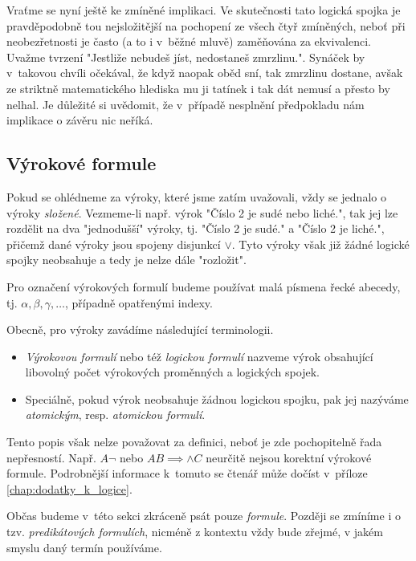 Vraťme se nyní ještě ke zmíněné implikaci. Ve skutečnosti tato logická spojka je pravděpodobně tou nejsložitější na pochopení ze všech čtyř zmíněných, neboť při neobezřetnosti je často (a to i v~běžné mluvě) zaměňována za ekvivalenci. Uvažme tvrzení "Jestliže nebudeš jíst, nedostaneš zmrzlinu.". Synáček by v~takovou chvíli očekával, že když naopak oběd sní, tak zmrzlinu dostane, avšak ze striktně matematického hlediska mu ji tatínek i tak dát nemusí a přesto by nelhal. Je důležité si uvědomit, že v~případě nesplnění předpokladu nám implikace o závěru nic neříká.\par

\subsection{Výrokové formule}
Pokud se ohlédneme za výroky, které jsme zatím uvažovali, vždy se jednalo o výroky \emph{složené}. Vezmeme-li např. výrok "Číslo 2 je sudé nebo liché.", tak jej lze rozdělit na dva "jednodušší" výroky, tj. "Číslo 2 je sudé." a "Číslo 2 je liché.", přičemž dané výroky jsou spojeny disjunkcí $\lor$. Tyto výroky však již žádné logické spojky neobsahuje a tedy je nelze dále "rozložit".
\begin{convention}
    Pro označení výrokových formulí budeme používat malá písmena řecké abecedy, tj. $\alpha,\beta,\gamma,\dots$, případně opatřenými indexy.
\end{convention}
Obecně, pro výroky zavádíme následující terminologii.
\begin{itemize}
    \item \emph{Výrokovou formulí} nebo též \emph{logickou formulí} nazveme výrok obsahující libovolný počet výrokových proměnných a logických spojek.
    \item Speciálně, pokud výrok neobsahuje žádnou logickou spojku, pak jej nazýváme \emph{atomickým}, resp. \emph{atomickou formulí}.
\end{itemize}
Tento popis však nelze považovat za definici, neboť je zde pochopitelně řada nepřesností. Např. $A\neg$ nebo $AB\implies\land C$ neurčitě nejsou korektní výrokové formule. Podrobnější informace k~tomuto se čtenář může dočíst v~příloze \ref{chap:dodatky_k_logice}.
\begin{remark}
    Občas budeme v~této sekci zkráceně psát pouze \emph{formule}. Později se zmíníme i o tzv. \emph{predikátových formulích}, nicméně z kontextu vždy bude zřejmé, v jakém smyslu daný termín používáme.
\end{remark}
